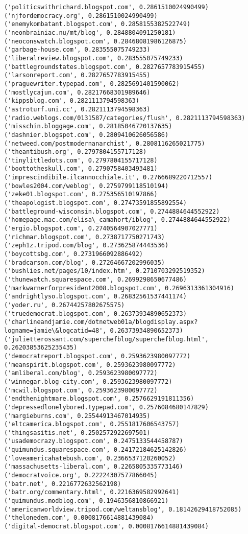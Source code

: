 \documentclass[11pt]{article}
\begin{document}
\begin{Verbatim}[commandchars=\\\{\}]
('politicswithrichard.blogspot.com', 0.2861510024990499)
('njfordemocracy.org', 0.2861510024990499)
('enemykombatant.blogspot.com', 0.2858155382522749)
('neonbrainiac.nu/mt/blog', 0.2848804091250181)
('neoconswatch.blogspot.com', 0.28468081986126875)
('garbage-house.com', 0.283555075749233)
('liberalreview.blogspot.com', 0.283555075749233)
('battlegroundstates.blogspot.com', 0.2827657783915455)
('larsonreport.com', 0.2827657783915455)
('praguewriter.typepad.com', 0.2825691401590062)
('mostlycajun.com', 0.28217668301989646)
('kippsblog.com', 0.2821113794598363)
('astroturf.uni.cc', 0.2821113794598363)
('radio.weblogs.com/0131587/categories/flush', 0.2821113794598363)
('misschin.bloggage.com', 0.28185046720137635)
('dashnier.blogspot.com', 0.2809410626056586)
('netweed.com/postmodernanarchist', 0.2808116265021775)
('theantibush.org', 0.2797804155717128)
('tinylittledots.com', 0.2797804155717128)
('boottotheskull.com', 0.2790758403493481)
('imprescindibile.ilcannocchiale.it', 0.2766689220712557)
('bowles2004.com/weblog', 0.2759799118510194)
('zeke01.blogspot.com', 0.275356510197866)
('theapologist.blogspot.com', 0.27473591855892554)
('battleground-wisconsin.blogspot.com', 0.2744884644552922)
('homepage.mac.com/elisa\_camahort/iblog', 0.2744884644552922)
('ergio.blogspot.com', 0.2740564907027771)
('richmar.blogspot.com', 0.2738717750271743)
('zeph1z.tripod.com/blog', 0.273625874443536)
('boycottsbg.com', 0.2731966092886492)
('bradcarson.com/blog', 0.27264667202996035)
('bushlies.net/pages/10/index.htm', 0.2710703292519352)
('thunewatch.squarespace.com', 0.2699298650677486)
('markwarnerforpresident2008.blogspot.com', 0.2696313361304916)
('andrightlyso.blogspot.com', 0.26832561537441174)
('yoder.ru', 0.26744257802675575)
('truedemocrat.blogspot.com', 0.26373934890652373)
('charlineandjamie.com/dotnetweb01a/blogdisplay.aspx?logname=jamie\&logcatid=48', 0.26373934890652373)
('julietterossant.com/superchefblog/superchefblog.html', 0.26203853625235435)
('democratreport.blogspot.com', 0.2593623980097772)
('meanspirit.blogspot.com', 0.2593623980097772)
('amliberal.com/blog', 0.2593623980097772)
('winnegar.blog-city.com', 0.2593623980097772)
('mcwil.blogspot.com', 0.2593623980097772)
('endthenightmare.blogspot.com', 0.2576629191811356)
('depressedlonelybored.typepad.com', 0.2576084680147829)
('margieburns.com', 0.25544913467014935)
('eltcamerica.blogspot.com', 0.2551817606543757)
('thingsasitis.net', 0.2502572922697501)
('usademocrazy.blogspot.com', 0.2475133544458787)
('quimundus.squarespace.com', 0.24172184625142826)
('loveamericahatebush.com', 0.2366537120260052)
('massachusetts-liberal.com', 0.2265805335773146)
('democratvoice.org', 0.22224307577866045)
('batr.net', 0.2216772632562198)
('batr.org/commentary.html', 0.2216369582992641)
('quimundus.modblog.com', 0.1946356810866921)
('americanworldview.tripod.com/weltansblog', 0.18142629418752085)
('thelonedem.com', 0.0008176614881439084)
('digital-democrat.blogspot.com', 0.0008176614881439084)

    \end{Verbatim}
\end{document}
